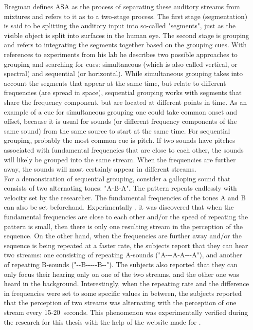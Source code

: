 Bregman defines ASA as the process of separating these auditory streams from mixtures and refers to it as to a two-stage process. The first stage (segmentation) is said to be splitting the auditory input into so-called "segments", just as the visible object is split into surfaces in the human eye. The second stage is grouping and refers to integrating the segments together based on the grouping cues. With references to experiments from his lab he describes two possible approaches to grouping and searching for cues: simultaneous (which is also called vertical, or spectral) and sequential (or horizontal). While simultaneous grouping takes into account the segments that appear at the same time, but relate to different frequencies (are spread in space), sequential grouping works with segments that share the frequency component, but are located at different points in time. As an example of a cue for simultaneous grouping one could take common onset and offset, because it is usual for sounds (or different frequency components of the same sound) from the same source to start at the same time. For sequential grouping, pro\-bab\-ly the most common cue is pitch. If two sounds have pitches associated with fundamental frequencies that are close to each other, the sounds will likely be grouped into the same stream. When the frequencies are further away, the sounds will most certainly appear in different streams.\\

For a demonstration of sequential grouping, consider a galloping sound that consists of two alternating tones: "A-B-A". The pattern repeats endlessly with velocity set by the researcher. The fundamental frequencies of the tones A and B can also be set beforehand. Experimentally \cite{Schnupp2011}, it was discovered that when the fundamental frequencies are close to each other and/or the speed of repeating the pattern is small, then there is only one resulting stream in the perception of the sequence. On the other hand, when the frequencies are further away and/or the sequence is being repeated at a faster rate, the subjects report that they can hear two streams: one consisting of repeating A-sounds ("A-{}-{}-A-A-{}-{}-A"), and another of repeating B-sounds ("-{}-B-{}-{}-{}-{}-B-{}-"). The subjects also reported that they can only focus their hearing only on one of the two streams, and the other one was heard in the background. Interestingly, when the repeating rate and the difference in frequencies were set to some specific values in between, the subjects reported that the perception of two streams was alternating with the perception of one stream every 15-20~seconds. This phenomenon was experimentally verified during the research for this thesis with the help of the website made for \cite{Schnupp2011}.\\

